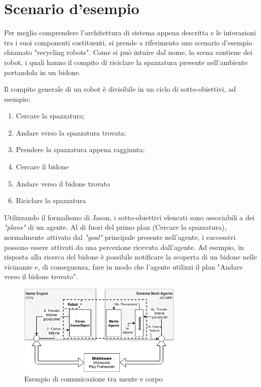 \section{Scenario d'esempio}

Per meglio comprendere l'architettura di sistema appena descritta e le interazioni tra i suoi componenti costituenti, si prende a riferimento uno scenario d'esempio chiamato "recycling robots". Come si può intuire dal nome, la scena contiene dei robot, i quali hanno il compito di riciclare la spazzatura presente nell'ambiente portandola in un bidone.

\medskip

Il compito generale di un robot è divisibile in un ciclo di sotto-obiettivi, ad esempio:
\begin{enumerate}
    \item Cercare la spazzatura;
    \item Andare verso la spazzatura trovata;
    \item Prendere la spazzatura appena raggiunta;
    \item Cercare il bidone
    \item Andare verso il bidone trovato
    \item Riciclare la spazzatura
\end{enumerate}

Utilizzando il formalismo di Jason, i sotto-obiettivi elencati sono associabili a dei \textit{"plans"} di un agente. Al di fuori del primo plan (Cercare la spazzatura), normalmente attivato dal \textit{"goal"} principale presente nell'agente, i successivi possono essere attivati da una percezione ricevuta dall'agente. Ad esempio, in risposta alla ricerca del bidone è possibile notificare la scoperta di un bidone nelle vicinanze e, di conseguenza, fare in modo che l'agente utilizzi il plan "Andare verso il bidone trovato".

\begin{figure}[H]
\centering
\includegraphics[width=0.7\textwidth]{figures/Esempio_relazione.png}
\caption{Esempio di comunicazione tra mente e corpo}
\end{figure}

